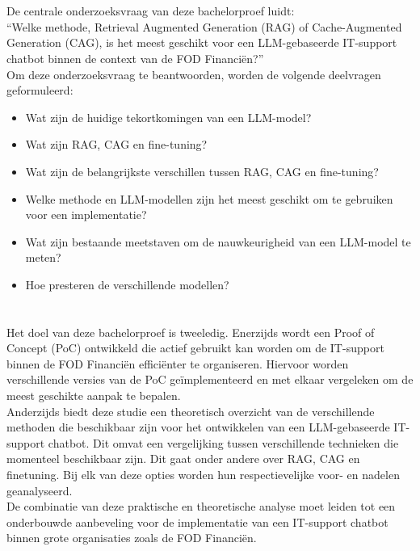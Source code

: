 \section{}%
\label{sec:onderzoeksvraag}

De centrale onderzoeksvraag van deze bachelorproef luidt:
\\[1em]
“{Welke methode, Retrieval Augmented Generation (RAG) of Cache-Augmented Generation (CAG), is het meest geschikt voor een LLM-gebaseerde IT-support chatbot binnen de context van de FOD Financiën?}”
\\[1em]
Om deze onderzoeksvraag te beantwoorden, worden de volgende deelvragen geformuleerd:

\begin{itemize}
    \item Wat zijn de huidige tekortkomingen van een LLM-model?
    \item Wat zijn  RAG, CAG en fine-tuning?
    \item Wat zijn de belangrijkste verschillen tussen RAG, CAG en fine-tuning?
    \item Welke methode en LLM-modellen zijn het meest geschikt om te gebruiken voor een implementatie?
    \item Wat zijn bestaande meetstaven om de nauwkeurigheid van een LLM-model te meten?
    \item Hoe presteren de verschillende modellen?
\end{itemize}

\section{}%
\label{sec:onderzoeksdoelstelling}

Het doel van deze bachelorproef is tweeledig. Enerzijds wordt een Proof of Concept (PoC) ontwikkeld die actief gebruikt kan worden om de IT-support binnen de FOD Financiën efficiënter te organiseren. Hiervoor worden verschillende versies van de PoC geïmplementeerd en met elkaar vergeleken om de meest geschikte aanpak te bepalen.
\\[1em]
Anderzijds biedt deze studie een theoretisch overzicht van de verschillende methoden die beschikbaar zijn voor het ontwikkelen van een LLM-gebaseerde IT-support chatbot. Dit omvat een vergelijking tussen verschillende technieken die momenteel beschikbaar zijn. Dit gaat onder andere over RAG, CAG en finetuning. Bij elk van deze opties worden hun respectievelijke voor- en nadelen geanalyseerd.
\\[1em]
De combinatie van deze praktische en theoretische analyse moet leiden tot een onderbouwde aanbeveling voor de implementatie van een IT-support chatbot binnen grote organisaties zoals de FOD Financiën.

